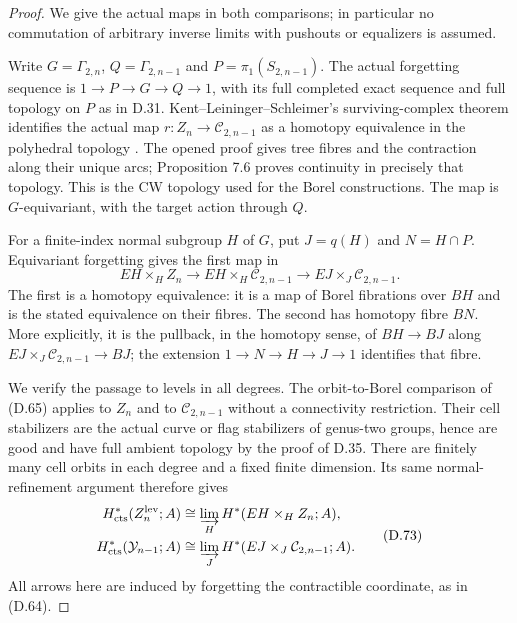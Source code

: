 \begin{proof}
We give the actual maps in both comparisons; in particular no
commutation of arbitrary inverse limits with pushouts or equalizers
is assumed.

Write $G=\Gamma_{2,n}$, $Q=\Gamma_{2,n-1}$ and
$P=\pi_1(S_{2,n-1})$.  The actual forgetting sequence is
$1\to P\to G\to Q\to1$, with its full completed exact sequence
and full topology on $P$ as in D.31.  Kent--Leininger--Schleimer's
surviving-complex theorem identifies the actual map
$r:Z_n\to\mathcal C_{2,n-1}$ as a homotopy equivalence in the
polyhedral topology
\cite[Theorem 7.1, Corollary 7.2, and Proposition 7.6]
{KentLeiningerSchleimer2009}.
The opened proof gives tree fibres and the contraction along
their unique arcs; Proposition 7.6 proves continuity in precisely
that topology.  This is the CW topology used for the Borel
constructions.  The map is $G$-equivariant, with the target action
through $Q$.

For a finite-index normal subgroup $H$ of $G$, put
$J=q(H)$ and $N=H\cap P$.  Equivariant forgetting gives
the first map in
\[
 EH\times_H Z_n
       \longrightarrow EH\times_H\mathcal C_{2,n-1}
       \longrightarrow EJ\times_J\mathcal C_{2,n-1}.           \tag{D.72}
\]
The first is a homotopy equivalence: it is a map of Borel
fibrations over $BH$ and is the stated equivalence on their
fibres.  The second has homotopy fibre $BN$.  More explicitly,
it is the pullback, in the homotopy sense, of $BH\to BJ$ along
$EJ\times_J\mathcal C_{2,n-1}\to BJ$; the extension
$1\to N\to H\to J\to1$ identifies that fibre.

We verify the passage to levels in all degrees.  The orbit-to-Borel
comparison of (D.65) applies to $Z_n$ and to
$\mathcal C_{2,n-1}$ without a connectivity restriction.  Their
cell stabilizers are the actual curve or flag stabilizers of
genus-two groups, hence are good and have full ambient topology
by the proof of D.35.  There are finitely many cell orbits in each
degree and a fixed finite dimension.  Its same normal-refinement
argument therefore gives
\[
\begin{split}
 H^*_{\rm cts}(Z_n^{\rm lev};A)
   &\cong\varinjlim_H H^*(EH\times_H Z_n;A),\\
 H^*_{\rm cts}(\mathcal Y_{n-1};A)
   &\cong\varinjlim_J
             H^*(EJ\times_J\mathcal C_{2,n-1};A).
\end{split}                                                    \tag{D.73}
\]
All arrows here are induced by forgetting the contractible
coordinate, as in (D.64).


\end{proof}
